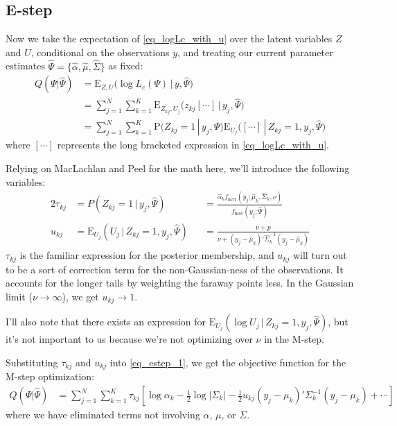\documentclass[11pt]{article}
\begin{document}
\subsection{E-step}

Now we take the expectation of \eqref{eq_logLc_with_u} over the latent variables $Z$ and $U$, conditional on the observations $y$, and treating our current parameter estimates $\hat\Psi = \{\hat\alpha, \hat\mu, \hat\Sigma\}$ as fixed:
\begin{align}
	Q(\Psi | \hat\Psi) &= \mathrm{E}_{Z,U} \big( \log L_c(\Psi) \,|\, y, \hat\Psi \big) \nonumber \\
	&= \sum_{j=1}^N \sum_{k=1}^K \mathrm{E}_{Z_{kj},U_j } \big( z_{kj} [\cdots] \,|\, y_j, \hat\Psi  \big) \nonumber \\
	&= \sum_{j=1}^N \sum_{k=1}^K \mathrm{P}(Z_{kj}=1 \,|\, y_j, \hat\Psi ) \mathrm{E}_{U_j} \big( [\cdots] \,|\, Z_{kj}=1, y_j, \hat\Psi  \big)
	\label{eq_estep_1}
\end{align}
where $[\cdots]$ represents the long bracketed expression in \eqref{eq_logLc_with_u}. 

Relying on MacLachlan and Peel for the math here, we'll introduce the following variables:
\begin{alignat}{2}
	\tau_{kj} &= P(Z_{kj} = 1  \,|\, y_j, \hat\Psi ) &
		&= \frac{\hat\alpha_k f_{\mathrm{mvt}}(y_j ; \hat\mu_k, \hat\Sigma_k, \nu )}
		{f_{\mathrm{mot}}(y_j ; \hat\Psi)} \\
	u_{kj} &= \mathrm{E}_{U_j}( U_j \,|\, Z_{kj}=1, y_j, \hat\Psi) &
		&= \frac{\nu + p}{\nu + (y_j - \hat\mu_k)' \hat\Sigma_k^{-1} (y_j - \hat\mu_k) }
\end{alignat}
$\tau_{kj}$ is the familiar expression for the posterior membership, and $u_{kj}$ will turn out to be a sort of correction term for the non-Gaussian-ness of the observations. It accounts for the longer tails by weighting the faraway points less. In the Gaussian limit ($\nu \to \infty$), we get $u_{kj}\to 1$.

I'll also note that there exists an expression for $\mathrm{E}_{U_j}(\log U_j \, | \, Z_{kj}=1, y_j, \hat\Psi)$, but it's not important to us because we're not optimizing over $\nu$ in the M-step.

Substituting $\tau_{kj}$ and $u_{kj}$ into \eqref{eq_estep_1}, we get the objective function for the M-step optimization:
\begin{align}
	Q(\Psi | \hat\Psi) &= \sum_{j=1}^N \sum_{k=1}^K \tau_{kj} \left[
		\log \alpha_k - \frac12 \log |\Sigma_k| 
		- \frac12u_{kj}(y_j - \mu_k)' \Sigma_k^{-1} (y_j - \mu_k)
		+ \cdots \right]
	\label{eq_estep}
\end{align}
where we have eliminated terms not involving $\alpha$, $\mu$, or $\Sigma$.
\end{document}
